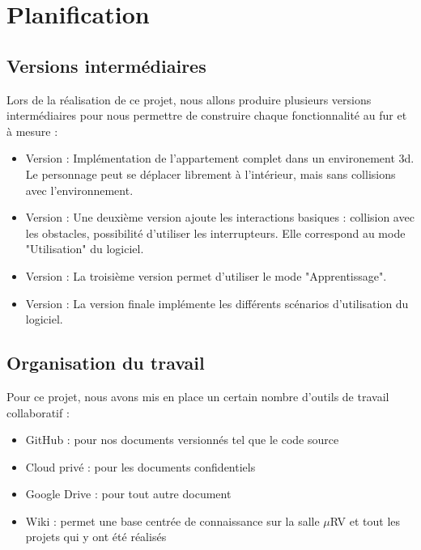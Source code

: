 \section{Planification}
\subsection{Versions intermédiaires}
Lors de la réalisation de ce projet, nous allons produire plusieurs versions intermédiaires pour nous permettre de construire chaque fonctionnalité au fur et à mesure :
\begin{itemize}
  \item Version  : Implémentation de l'appartement complet dans un environement 3d. Le personnage peut se déplacer librement à l'intérieur, mais sans collisions avec l'environnement.
  \item Version  : Une deuxième version ajoute les interactions basiques : collision avec les obstacles, possibilité d'utiliser les interrupteurs. Elle correspond au mode "Utilisation" du logiciel.
  \item Version  : La troisième version permet d'utiliser le mode "Apprentissage".
  \item Version  : La version finale implémente les différents scénarios d'utilisation du logiciel.
\end{itemize}

\subsection{Organisation du travail}
Pour ce projet, nous avons mis en place un certain nombre d'outils de travail collaboratif :

\begin{itemize}
  \item GitHub : pour nos documents versionnés tel que le code source
  \item Cloud privé : pour les documents confidentiels
  \item Google Drive : pour tout autre document
  \item Wiki : permet une base centrée de connaissance sur la salle $\mu$RV et tout les projets qui y ont été réalisés
\end{itemize}


